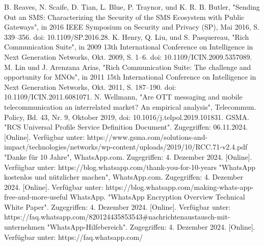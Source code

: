 \documentclass[conference]{IEEEtran}
\begin{document}
\begin{thebibliography}{00}
     B. Reaves, N. Scaife, D. Tian, L. Blue, P. Traynor, und K. R. B. Butler, "Sending Out an SMS: Characterizing the Security of the SMS Ecosystem with Public Gateways", in 2016 IEEE Symposium on Security and Privacy (SP), Mai 2016, S. 339–356. doi: 10.1109/SP.2016.28.
     K. Henry, Q. Liu, und S. Pasquereau, "Rich Communication Suite", in 2009 13th International Conference on Intelligence in Next Generation Networks, Okt. 2009, S. 1–6. doi: 10.1109/ICIN.2009.5357089.
     M. Lin und J. Arenzana Arias, "Rich Communication Suite: The challenge and opportunity for MNOs", in 2011 15th International Conference on Intelligence in Next Generation Networks, Okt. 2011, S. 187–190. doi: 10.1109/ICIN.2011.6081071.
     N. Wellmann, "Are OTT messaging and mobile telecommunication an interrelated market? An empirical analysis", Telecommun. Policy, Bd. 43, Nr. 9, Oktober 2019, doi: 10.1016/j.telpol.2019.101831.
     GSMA. "RCS Universal Profile Service Definition Document". Zugegriffen: 06.11.2024. [Online]. Verfügbar unter: https://www.gsma.com/solutions-and-impact/technologies/networks/wp-content/uploads/2019/10/RCC.71-v2.4.pdf
     "Danke für 10 Jahre", WhatsApp.com. Zugegriffen: 4. Dezember 2024. [Online]. Verfügbar unter: https://blog.whatsapp.com/thank-you-for-10-years
     "WhatsApp kostenlos und nützlicher machen", WhatsApp.com. Zugegriffen: 4. Dezember 2024. [Online]. Verfügbar unter: https://blog.whatsapp.com/making-whats-app-free-and-more-useful
     WhatsApp. "WhatsApp Encryption Overview Technical White Paper". Zugegriffen: 4. Dezember 2024. [Online]. Verfügbar unter: https://faq.whatsapp.com/820124435853543\#nachrichtenaustausch-mit-unternehmen
     "WhatsApp-Hilfebereich". Zugegriffen: 4. Dezember 2024. [Online]. Verfügbar unter: https://faq.whatsapp.com/
\end{thebibliography}
\end{document}
